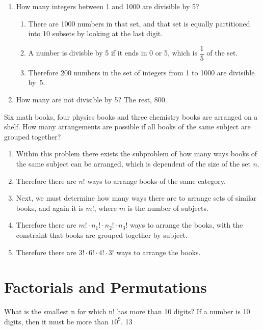 \documentclass[openany, 11pt]{book}
\begin{document}
\begin{exercise}{}{}
	\begin{enumerate}[label = {(\arabic*)}]
		\item How many integers between 1 and 1000 are divisible by 5?
		      \begin{enumerate}[label={}, leftmargin=*, itemsep=0pt, parsep=0pt]
			      \item There are 1000 numbers in that set, and that set is equally partitioned
			            into 10 subsets by looking at the last digit.
			      \item A number is divisble by 5 if it ends in 0 or 5, which is $\dfrac{1}{5}$ of
			            the set.
			      \item Therefore 200 numbers in the set of integers from 1 to 1000 are divisible
			            \mbox{by 5}.
		      \end{enumerate}
		\item How many are not divisible by 5?
		      The rest, 800.
	\end{enumerate}
\end{exercise}

\begin{exercise}{}{}
	Six math books, four physics books and three chemistry books are
	arranged on a shelf. How many arrangements are possible if all books of the
	same subject are grouped together?
	\begin{enumerate}[label={\textbullet}, leftmargin=*, itemsep=0pt, parsep=0pt]
		\item Within this problem there exists the subproblem of how many ways books of
		      the same subject can be arranged, which is dependent of the size of the set
		      $n$.
		\item Therefore there are $n!$ ways to arrange books of the same category.
		\item Next, we must determine how many ways there are to arrange sets of similar
		      books, and again it is $m!$, where $m$ is the number of subjects.
		\item Therefore there are $m! \cdot n_1! \cdot n_2! \cdot n_3!$ ways to arrange the
		      books, with the constraint that books are grouped together by subject.
		\item Therefore there are $3! \cdot 6! \cdot 4! \cdot 3!$ ways to arrange the
		      books.
	\end{enumerate}
\end{exercise}

\section{Factorials and Permutations}
\begin{exercise}{}{}
	What is the smallest n for which n! has more than 10 digits?
	If a number is 10 digits, then it must be more than $10^{9}$. 13
\end{exercise}
\end{document}
